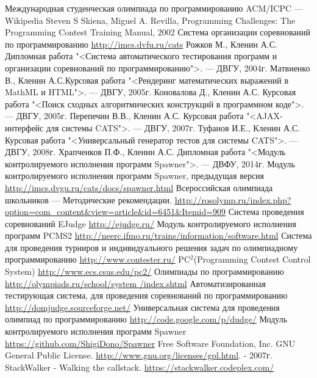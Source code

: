 \documentclass{imcs}
\begin{document}
\begin{thebibliography}{99}
 Международная студенческая олимпиада по программированию ACM/ICPC — Wikipedia
 Steven S Skiena, Miguel A. Revilla, Programming Challenges: The Programming Contest Training Manual, 2002
 Система организации соревнований по программированию \url{http://imcs.dvfu.ru/cats}
 Рожков М., Кленин А.С. Дипломная работа "<Система автоматического тестирования программ и организации соревнований по программированию">. — ДВГУ, 2004г.
 Матвиенко В., Кленин А.С.Курсовая работа "<Рендеринг математических выражений в MathML и HTML">. — ДВГУ, 2005г.
 Коновалова Д., Кленин А.С. Курсовая работа "<Поиск сходных алгоритмических конструкций в программном коде">. — ДВГУ, 2005г.
 Перепечин В.В., Кленин А.С. Курсовая работа "<AJAX-интерфейс для системы CATS">. — ДВГУ, 2007г.
 Туфанов И.Е., Кленин А.С. Курсовая работа "<Универсальный генератор тестов для системы CATS">. — ДВГУ, 2008г.
 Храпченков П.Ф., Кленин А.С. Дипломная работа "<Модуль контролируемого исполнения программ Spawner">. — ДВФУ, 2014г.
 Модуль контролируемого исполнения программ Spawner, предыдущая версия \url{http://imcs.dvgu.ru/cats/docs/spawner.html}
 Всероссийская олимпиада школьников — Методические рекомендации. \url{http://rosolymp.ru/index.php?option=com_content&view=article&id=6451&Itemid=909}
 Система проведения соревнований EJudge \url{http://ejudge.ru/}
 Модуль контролируемого исполнения программ PCMS2 \url{http://neerc.ifmo.ru/trains/information/software.html}
 Система для проведения турниров и индивидуального решения задач по олимпиадному программированию \url{http://www.contester.ru/}
 PC$^2$(Programming Contest Control System) \url{http://www.ecs.csus.edu/pc2/}
 Олимпиады по программированию \url{http://olympiads.ru/school/system
/index.shtml}
 Автоматизированная тестирующая система, для проведения соревнований по программированию \url{http://domjudge.sourceforge.net/}
 Универсальная система для проведения олимпиад по программированию \url{http://code.google.com/p/dudge/}
 Модуль контролируемого исполнения программ Spawner \url{https://github.com/ShigiDono/Spawner}
 Free Software Foundation, Inc. GNU General Public License. \url{http://www.gnu.org/licenses/gpl.html}. - 2007г.
 StackWalker - Walking the callstack. \url{https://stackwalker.codeplex.com/}

\end{thebibliography}
\end{document}
